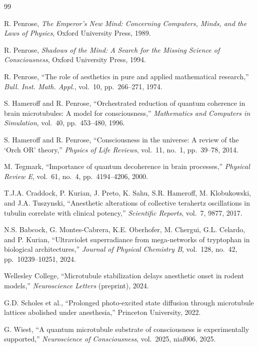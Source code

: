 \documentclass[12pt,a4paper]{article}
\theoremstyle{plain}
\theoremstyle{definition}
\begin{document}
\begin{thebibliography}{99}

R. Penrose, \textit{The Emperor's New Mind: Concerning Computers, Minds, and the Laws of Physics}, Oxford University Press, 1989.

R. Penrose, \textit{Shadows of the Mind: A Search for the Missing Science of Consciousness}, Oxford University Press, 1994.

R. Penrose, ``The role of aesthetics in pure and applied mathematical research,'' \textit{Bull. Inst. Math. Appl.}, vol.~10, pp.~266--271, 1974.

S. Hameroff and R. Penrose, ``Orchestrated reduction of quantum coherence in brain microtubules: A model for consciousness,'' \textit{Mathematics and Computers in Simulation}, vol.~40, pp.~453--480, 1996.

S. Hameroff and R. Penrose, ``Consciousness in the universe: A review of the `Orch OR' theory,'' \textit{Physics of Life Reviews}, vol.~11, no.~1, pp.~39--78, 2014.

M. Tegmark, ``Importance of quantum decoherence in brain processes,'' \textit{Physical Review E}, vol.~61, no.~4, pp.~4194--4206, 2000.

T.J.A. Craddock, P. Kurian, J. Preto, K. Sahu, S.R. Hameroff, M. Klobukowski, and J.A. Tuszynski, ``Anesthetic alterations of collective terahertz oscillations in tubulin correlate with clinical potency,'' \textit{Scientific Reports}, vol.~7, 9877, 2017.

N.S. Babcock, G. Montes-Cabrera, K.E. Oberhofer, M. Chergui, G.L. Celardo, and P. Kurian, ``Ultraviolet superradiance from mega-networks of tryptophan in biological architectures,'' \textit{Journal of Physical Chemistry B}, vol.~128, no.~42, pp.~10239--10251, 2024.

Wellesley College, ``Microtubule stabilization delays anesthetic onset in rodent models,'' \textit{Neuroscience Letters} (preprint), 2024.

G.D. Scholes et al., ``Prolonged photo-excited state diffusion through microtubule lattices abolished under anesthesia,'' Princeton University, 2022.

G. Wiest, ``A quantum microtubule substrate of consciousness is experimentally supported,'' \textit{Neuroscience of Consciousness}, vol.~2025, niaf006, 2025.


\end{thebibliography}
\end{document}
